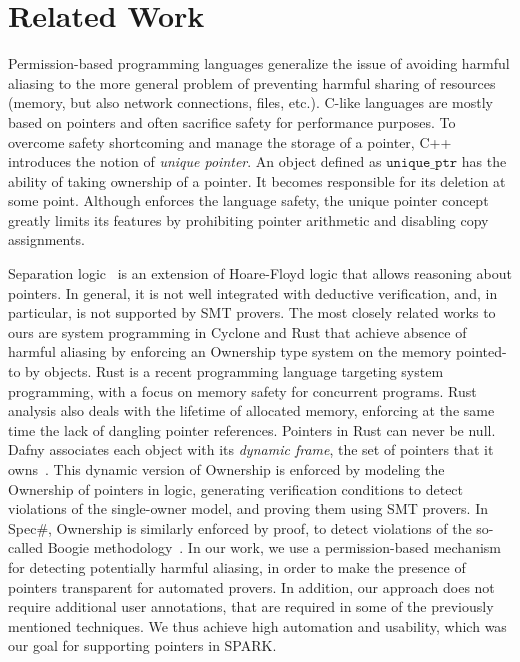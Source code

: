 \documentclass{llncs}
\newcommand\var[1]{\ensuremath{\mathtt{#1}}}
\begin{document}
\section{Related Work}


Permission-based programming languages generalize the issue of avoiding harmful aliasing to the more general problem of preventing harmful sharing of resources
(memory, but also network connections, files, etc.). C-like languages are mostly based on pointers and often sacrifice safety for performance purposes.
To overcome safety shortcoming and manage the storage of a pointer, C++ introduces the notion of \textit{unique pointer}. An object defined as \var{unique\_ptr}
has the ability of taking ownership of a pointer. It becomes responsible for its deletion at some point. Although enforces the language safety, the unique
pointer concept greatly limits its features by prohibiting pointer arithmetic and disabling copy assignments.
 
Separation logic~\cite{Reynolds02} is an extension of Hoare-Floyd logic that allows reasoning about pointers. In general, it is not well integrated with deductive
verification, and, in particular, is not supported by SMT provers.
The most closely related works to ours are system programming in Cyclone \cite{Grossman2002} and Rust \cite{Balasubramanian17} that achieve absence of
harmful aliasing by enforcing an Ownership type system on the memory pointed-to by objects. Rust is a recent programming language targeting system
programming, with a focus on memory safety for concurrent programs.
Rust analysis also deals with the lifetime of allocated memory, enforcing
at the same time the lack of dangling pointer references. Pointers in Rust can never be null.
Dafny associates each object with its \emph{dynamic frame}, the set of pointers that it owns~\cite{Leino10}. This dynamic version of Ownership is
enforced by modeling the Ownership of pointers in logic, generating verification conditions to detect violations of the single-owner model, and proving
them using SMT provers. In Spec\#, Ownership is similarly enforced by proof, to detect violations of the so-called Boogie methodology~\cite{Boogie}.
In our work, we use a permission-based mechanism for detecting potentially harmful aliasing, in order to make the presence of pointers transparent for automated provers.
In addition, our approach does not require additional user annotations, that are required in some of the previously mentioned techniques. We thus achieve high automation
and usability, which was our goal for supporting pointers in SPARK.
\end{document}
